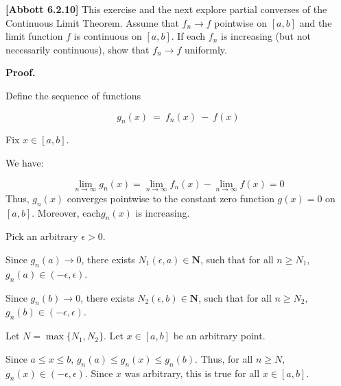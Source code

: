 \documentclass[10pt]{article}
\begin{document}
\textbf{[Abbott 6.2.10] }This exercise and the next explore partial converses of the Continuous Limit Theorem. Assume that $\displaystyle f_{n}\rightarrow f$ pointwise on $\displaystyle [ a,b]$ and the limit function $\displaystyle f$ is continuous on $\displaystyle [ a,b]$. If each $\displaystyle f_{n}$ is increasing (but not necessarily continuous), show that $\displaystyle f_{n}\rightarrow f$ uniformly.



\textbf{Proof.}



Define the sequence of functions


\begin{equation*}
g_{n}( x) \ =\ f_{n}( x) \ -\ f( x)
\end{equation*}


Fix $\displaystyle x\in [ a,b]$. 



We have:

 
\begin{equation*}
\lim _{n\rightarrow \infty } g_{n}( x) =\lim _{n\rightarrow \infty } f_{n}( x) -\lim _{n\rightarrow \infty } f( x) =0
\end{equation*}
Thus, $\displaystyle g_{n}( x)$ converges pointwise to the constant zero function $\displaystyle g( x) =0$ on $\displaystyle [ a,b]$. Moreover, each$\displaystyle g_{n}( x)$ is increasing. 



Pick an arbitrary $\displaystyle \epsilon  >0$.



Since $\displaystyle g_{n}( a)\rightarrow 0$, there exists $\displaystyle N_{1}( \epsilon ,a) \in \mathbf{N}$, such that for all $\displaystyle n\geq N_{1}$, $\displaystyle g_{n}( a) \in ( -\epsilon ,\epsilon )$.



Since $\displaystyle g_{n}( b)\rightarrow 0$, there exists $\displaystyle N_{2}( \epsilon ,b) \in \mathbf{N}$, such that for all $\displaystyle n\geq N_{2} ,$$\displaystyle g_{n}( b) \in ( -\epsilon ,\epsilon )$.



Let $\displaystyle N=\max\{N_{1} ,N_{2}\}$. Let $\displaystyle x\in [ a,b]$ be an arbitrary point.



Since $\displaystyle a\leq x\leq b$, $\displaystyle g_{n}( a) \leq g_{n}( x) \leq g_{n}( b)$. Thus, for all $\displaystyle n\geq N$, $\displaystyle g_{n}( x) \in ( -\epsilon ,\epsilon )$. Since $\displaystyle x$ was arbitrary, this is true for all $\displaystyle x\in [ a,b]$.
\end{document}
